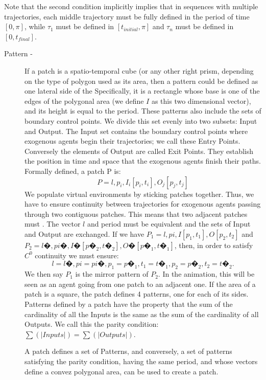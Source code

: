 Note that the second condition implicitly implies that in sequences with multiple trajectories, each middle trajectory must be fully defined in the period of time $[0,\pi]$, while $\tau_1$ must be defined in $[t_{initial},\pi]$ and $\tau_n$ must be defined in $[0, t_{final}]$.

\begin{description}

\item[Pattern -]{If a patch is a spatio-temporal cube (or any other right prism, depending on the type of polygon used as its area, then a pattern could be defined as one lateral side of the  Specifically, it is a rectangle whose base is one of the edges of the polygonal area (we define $I$ as this two dimensional vector), and its height is equal to the period. These patterns also include the sets of boundary control points. We divide this set evenly into two subsets: Input and Output. The Input set contains the boundary control points where exogenous agents begin their trajectories; we call these Entry Points. Conversely the elements of Output are called Exit Points. They establish the position in time and space that the exogenous agents finish their paths. Formally defined, a patch P is:
$$ P = {l, p_i, I_i [p_i, t_i], O_j[p_j, t_j]}$$
We populate virtual environments by sticking patches together. Thus, we have to ensure continuity between trajectories for exogenous agents passing through two contiguous patches. This means that two adjacent patches must . The vector $l$  and period must be equivalent and the sets of Input and Output are exchanged. If we have $P_1={l, pi, I [p_1,t_1], O[p_2,t_2]}$ and $P_2={l�, pi�, I�[p�_2, t�_2], O�[p�_1, t�_1]}$, then, in order to satisfy $C^0$ continuity we must ensure: 
$$ l=l�, pi=pi�, p_1=p�_1, t_1=t�_1, p_2=p�_2, t_2=t�_2.$$
We then say $P_1$ is the mirror pattern of $P_2$. In the animation, this will be seen as an agent going from one patch to an adjacent one. 
If the area of a patch is a square, the patch defines 4 patterns, one for each of its sides. Patterns defined by a patch have the property that the sum of the cardinality of all the Inputs is the same as the sum of the cardinality of all Outputs. We call this the parity condition: $\sum(|Inputs|)= \sum(|Outputs|)$.

A patch defines a set of Patterns, and conversely, a set of patterns satisfying the parity condition, having the same period, and whose vectors define a convez polygonal area, can be used to create a patch. 
 }

\end{description}



